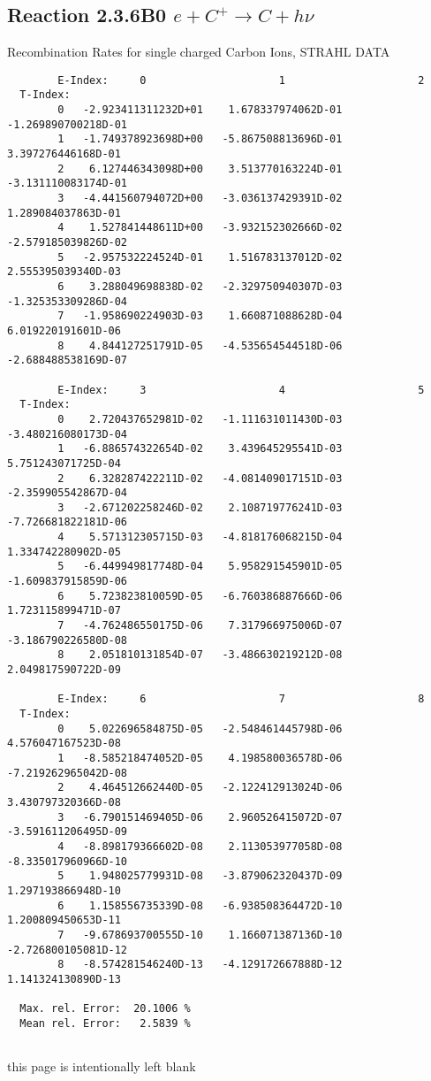 \documentclass[12pt]{article}
\begin{document}
\subsection{
Reaction 2.3.6B0  $e + C^{+} \rightarrow C + h\nu$
}
 Recombination Rates for single
 charged Carbon Ions, STRAHL DATA

\begin{small}\begin{verbatim}
        E-Index:     0                     1                     2
  T-Index:
        0   -2.923411311232D+01    1.678337974062D-01   -1.269890700218D-01
        1   -1.749378923698D+00   -5.867508813696D-01    3.397276446168D-01
        2    6.127446343098D+00    3.513770163224D-01   -3.131110083174D-01
        3   -4.441560794072D+00   -3.036137429391D-02    1.289084037863D-01
        4    1.527841448611D+00   -3.932152302666D-02   -2.579185039826D-02
        5   -2.957532224524D-01    1.516783137012D-02    2.555395039340D-03
        6    3.288049698838D-02   -2.329750940307D-03   -1.325353309286D-04
        7   -1.958690224903D-03    1.660871088628D-04    6.019220191601D-06
        8    4.844127251791D-05   -4.535654544518D-06   -2.688488538169D-07

        E-Index:     3                     4                     5
  T-Index:
        0    2.720437652981D-02   -1.111631011430D-03   -3.480216080173D-04
        1   -6.886574322654D-02    3.439645295541D-03    5.751243071725D-04
        2    6.328287422211D-02   -4.081409017151D-03   -2.359905542867D-04
        3   -2.671202258246D-02    2.108719776241D-03   -7.726681822181D-06
        4    5.571312305715D-03   -4.818176068215D-04    1.334742280902D-05
        5   -6.449949817748D-04    5.958291545901D-05   -1.609837915859D-06
        6    5.723823810059D-05   -6.760386887666D-06    1.723115899471D-07
        7   -4.762486550175D-06    7.317966975006D-07   -3.186790226580D-08
        8    2.051810131854D-07   -3.486630219212D-08    2.049817590722D-09

        E-Index:     6                     7                     8
  T-Index:
        0    5.022696584875D-05   -2.548461445798D-06    4.576047167523D-08
        1   -8.585218474052D-05    4.198580036578D-06   -7.219262965042D-08
        2    4.464512662440D-05   -2.122412913024D-06    3.430797320366D-08
        3   -6.790151469405D-06    2.960526415072D-07   -3.591611206495D-09
        4   -8.898179366602D-08    2.113053977058D-08   -8.335017960966D-10
        5    1.948025779931D-08   -3.879062320437D-09    1.297193866948D-10
        6    1.158556735339D-08   -6.938508364472D-10    1.200809450653D-11
        7   -9.678693700555D-10    1.166071387136D-10   -2.726800105081D-12
        8   -8.574281546240D-13   -4.129172667888D-12    1.141324130890D-13

  Max. rel. Error:  20.1006 %
  Mean rel. Error:   2.5839 %


\end{verbatim}\end{small}
\newpage
this page is intentionally left blank
\newpage
\end{document}
